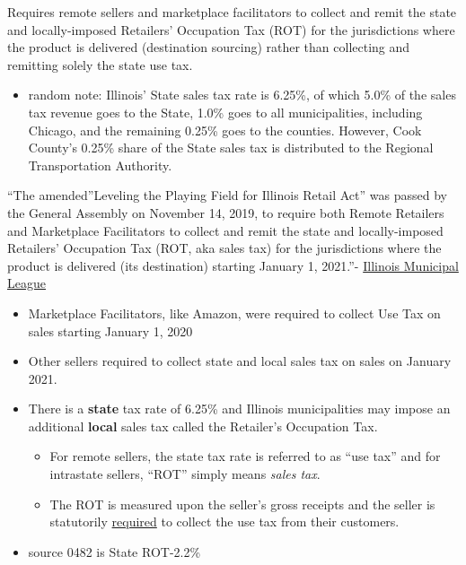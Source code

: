 \documentclass[
  letterpaper,
  DIV=11,
  numbers=noendperiod]{scrreport}
\providecommand{\tightlist}{%
  \setlength{\itemsep}{0pt}\setlength{\parskip}{0pt}}\usepackage{longtable,booktabs,array}
\begin{document}
Requires remote sellers and marketplace facilitators to collect and
remit the state and locally-imposed Retailers' Occupation Tax (ROT) for
the jurisdictions where the product is delivered (destination sourcing)
rather than collecting and remitting solely the state use tax.~

\begin{itemize}
\tightlist
\item
  random note: Illinois' State sales tax rate is 6.25\%, of which 5.0\%
  of the sales tax revenue goes to the State, 1.0\% goes to all
  municipalities, including Chicago, and the remaining 0.25\% goes to
  the counties. However, Cook County's 0.25\% share of the State sales
  tax is distributed to the Regional Transportation Authority.
\end{itemize}

``The amended''Leveling the Playing Field for Illinois Retail Act'' was
passed by the General Assembly on November 14, 2019, to require both
Remote Retailers and Marketplace Facilitators to collect and remit the
state and locally-imposed Retailers' Occupation Tax (ROT, aka sales tax)
for the jurisdictions where the product is delivered (its destination)
starting January 1, 2021.''-
\href{https://www.iml.org/file.cfm?key=16124}{Illinois Municipal League}

\begin{itemize}
\item
  Marketplace Facilitators, like Amazon, were required to collect Use
  Tax on sales starting January 1, 2020
\item
  Other sellers required to collect state and local sales tax on sales
  on January 2021.
\item
  There is a \textbf{state} tax rate of 6.25\% and Illinois
  municipalities may impose an additional \textbf{local} sales tax
  called the Retailer's Occupation Tax.

  \begin{itemize}
  \item
    For remote sellers, the state tax rate is referred to as ``use tax''
    and for intrastate sellers, ``ROT'' simply means \emph{sales tax}.~~
  \item
    The ROT is measured upon the seller's gross receipts and the seller
    is statutorily \uline{required} to collect the use tax from their
    customers.
  \end{itemize}
\item
  source 0482 is State ROT-2.2\%
\end{itemize}
\end{document}
